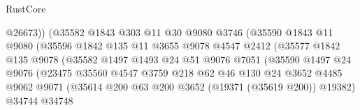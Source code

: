 \begin{lexlean}{RustCore}
\begin{coremodule}
                                  @26673))
                              (@35582
                                @1843
                                @303
                                @11
                                @30
                                @9080
                                @3746
                                (@35590
                                  @1843
                                  @11
                                  @9080
                                  (@35596
                                    @1842
                                    @135
                                    @11
                                    @3655
                                    @9078
                                    @4547
                                    @2412
                                    (@35577
                                      @1842
                                      @135
                                      @9078
                                      (@35582
                                        @1497
                                        @1493
                                        @24
                                        @51
                                        @9076
                                        @7051
                                        (@35590
                                          @1497
                                          @24
                                          @9076
                                          (@23475
                                            @35560
                                            @4547
                                            @3759
                                            @218
                                            @62
                                            @46
                                            @130
                                            @24
                                            @3652
                                            @4485
                                            @9062
                                            @9071
                                            (@35614
                                              @200
                                              @63
                                              @200
                                              @3652
                                              (@19371 (@35619 @200))
                                              @19382)
                                            @34744
                                            @34748

\end{coremodule}
\end{lexlean}
